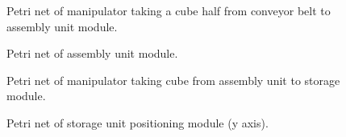 

\begin{landscape}
  \vspace*{\fill}
  \begin{figure}[h]
    \centering
    \resizebox{\hsize}{!}{
      
    }
    \caption{Petri net of manipulator taking a cube half from conveyor belt to assembly unit module.}
    \label{fig:petri_initialization}
  \end{figure}
  \vspace*{\fill}
\end{landscape}


 
\begin{landscape}
  \vspace*{\fill}
  \begin{figure}[h]
    \centering
    \resizebox{\hsize}{!}{
      
    }
    \caption{Petri net of assembly unit module.}
    \label{fig:petri_initialization}
  \end{figure}
  \vspace*{\fill}
\end{landscape}



\begin{landscape}
  \vspace*{\fill}
  \begin{figure}[h]
    \centering
    \resizebox{\hsize}{!}{
      
    }
    \caption{Petri net of manipulator taking cube from assembly unit to storage module.}
    \label{fig:petri_initialization}
  \end{figure}
  \vspace*{\fill}
\end{landscape}



\begin{landscape}
  \vspace*{\fill}
  \begin{figure}[h]
    \centering
    \resizebox{\hsize}{!}{
      
    }
    \caption{Petri net of storage unit positioning module (y axis).}
    \label{fig:petri_initialization}
  \end{figure}
  \vspace*{\fill}
\end{landscape}

